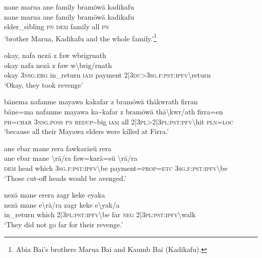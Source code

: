 \ea\label{ex:4:a1763}
nane marua ane family bramöwä kadikafu\\
\gll nane	marua	ane	family	bramöwä	kadikafu\\
     elder\_sibling	\textsc{pn}	\textsc{dem}	family	all	\textsc{pn}\\
\glt `brother Marua, Kadikafu and the whole family.'\footnote{Abia Bai's brothers Marua Bai and Kaumb Bai (Kadikafu).}
\z

\ea\label{ex:4:a1765}
okay, nafa nezä z faw wbrigrnath\\
\gll okay	nafa	nezä	z	faw	w{\textbackslash}brig/rnath\\
     okay	3\textsc{nsg}.\textsc{erg}	in\_return	\textsc{iam}	payment	2|3\textsc{du}>3\textsc{sg}.\textsc{f}:\textsc{pst}:\textsc{ipfv}{\textbackslash}return\\
\glt `Okay, they took revenge'
\z

\ea\label{ex:4:a1766}
bänema nafanme mayawa kakafar z bramöwä thäkwrath firran\\
\gll bäne=ma	nafanme	mayawa	ka{\textasciitilde}kafar	z	bramöwä	thä{\textbackslash}kwr/ath	firra=en\\
     \textsc{ph}=\textsc{char}	3\textsc{nsg}.\textsc{poss}	\textsc{pn}	\textsc{redup}{\textasciitilde}big	\textsc{iam}	all	2|3\textsc{pl}>2|3\textsc{pl}:\textsc{pst}:\textsc{pfv}{\textbackslash}hit	\textsc{pln}=\textsc{loc}\\
\glt `because all their Mayawa elders were killed at Firra.'
\z

\ea\label{ex:4:a1767}
ane ebar mane rera fawkaräsü rera\\
\gll ane	ebar	mane	{\textbackslash}rä/ra	faw=karä=sü	{\textbackslash}rä/ra\\
     \textsc{dem}	head	which	3\textsc{sg}.\textsc{f}:\textsc{pst}:\textsc{ipfv}{\textbackslash}be	payment=\textsc{prop}=\textsc{etc}	3\textsc{sg}.\textsc{f}:\textsc{pst}:\textsc{ipfv}{\textbackslash}be\\
\glt `Those cut-off heads would be avenged.'
\z

\ea\label{ex:4:a6698}
nezä mane erera zagr keke eyaka\\
\gll nezä	mane	e{\textbackslash}rä/ra	zagr	keke	e{\textbackslash}yak/a\\
     in\_return	which	2|3\textsc{pl}:\textsc{pst}:\textsc{ipfv}{\textbackslash}be	far	\textsc{neg}	2|3\textsc{pl}:\textsc{pst}:\textsc{ipfv}{\textbackslash}walk\\
\glt `They did not go far for their revenge.'
\z

